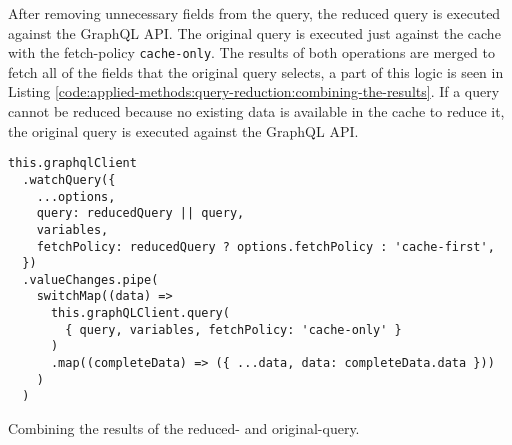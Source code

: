 \noindent After removing unnecessary fields from the query, the reduced query is executed against the GraphQL \ac{API}. The original query is executed just against the cache with the fetch-policy \texttt{cache-only}. The results of both operations are merged to fetch all of the fields that the original query selects, a part of this logic is seen in Listing \ref{code:applied-methods:query-reduction:combining-the-results}. If a query cannot be reduced because no existing data is available in the cache to reduce it, the original query is executed against the GraphQL \ac{API}.

\ifshowListings
\begin{listing}[H]
\begin{verbatim}
this.graphqlClient
  .watchQuery({
    ...options,
    query: reducedQuery || query,
    variables,
    fetchPolicy: reducedQuery ? options.fetchPolicy : 'cache-first',
  })
  .valueChanges.pipe(
    switchMap((data) =>
      this.graphQLClient.query(
        { query, variables, fetchPolicy: 'cache-only' }
      )
      .map((completeData) => ({ ...data, data: completeData.data }))
    )
  )
\end{verbatim}
\caption{Combining the results of the reduced- and original-query.}\label{code:applied-methods:query-reduction:combining-the-results}
\end{listing}
\fi
